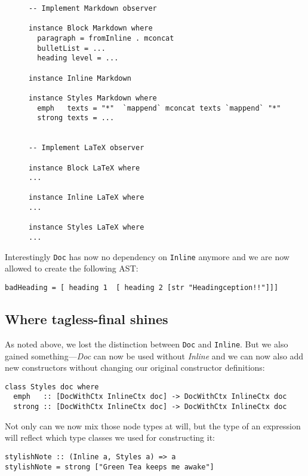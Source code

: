 \begin{figure}
\begin{lstlisting}
-- Implement Markdown observer

instance Block Markdown where
  paragraph = fromInline . mconcat
  bulletList = ...
  heading level = ...

instance Inline Markdown

instance Styles Markdown where
  emph   texts = "*"  `mappend` mconcat texts `mappend` "*"
  strong texts = ...


-- Implement LaTeX observer

instance Block LaTeX where
...

instance Inline LaTeX where
...

instance Styles LaTeX where
...
\end{lstlisting}
\end{figure}


Interestingly \texttt{Doc} has now no dependency on \texttt{Inline} anymore and
we are now allowed to create the following AST:

\begin{lstlisting}
badHeading = [ heading 1  [ heading 2 [str "Headingception!!"]]]
\end{lstlisting}

\subsection{Where tagless-final shines}

As noted above, we lost the distinction between \texttt{Doc} and
\texttt{Inline}. But we also gained something—\emph{Doc} can now be used
without \emph{Inline} and we can now also add new constructors without changing our
original constructor definitions:

\begin{lstlisting}
class Styles doc where
  emph   :: [DocWithCtx InlineCtx doc] -> DocWithCtx InlineCtx doc
  strong :: [DocWithCtx InlineCtx doc] -> DocWithCtx InlineCtx doc
\end{lstlisting}

Not only can we now mix those node types at will, but the type of an expression
will reflect which type classes we used for constructing it:

\begin{lstlisting}
stylishNote :: (Inline a, Styles a) => a
stylishNote = strong ["Green Tea keeps me awake"]
\end{lstlisting}

